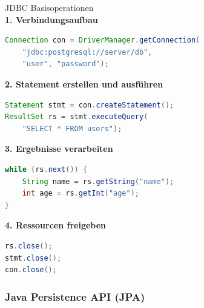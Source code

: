 \begin{code}{JDBC Basisoperationen}\\
\textbf{1. Verbindungsaufbau}
\begin{lstlisting}[language=Java, style=basesmol]
Connection con = DriverManager.getConnection(
    "jdbc:postgresql://server/db",
    "user", "password");
\end{lstlisting}

\textbf{2. Statement erstellen und ausführen}
\begin{lstlisting}[language=Java, style=basesmol]
Statement stmt = con.createStatement();
ResultSet rs = stmt.executeQuery(
    "SELECT * FROM users");
\end{lstlisting}

\textbf{3. Ergebnisse verarbeiten}
\begin{lstlisting}[language=Java, style=basesmol]
while (rs.next()) {
    String name = rs.getString("name");
    int age = rs.getInt("age");
}
\end{lstlisting}

\textbf{4. Ressourcen freigeben}
\begin{lstlisting}[language=Java, style=basesmol]
rs.close();
stmt.close();
con.close();
\end{lstlisting}
\end{code}



\subsubsection{Java Persistence API (JPA)}

